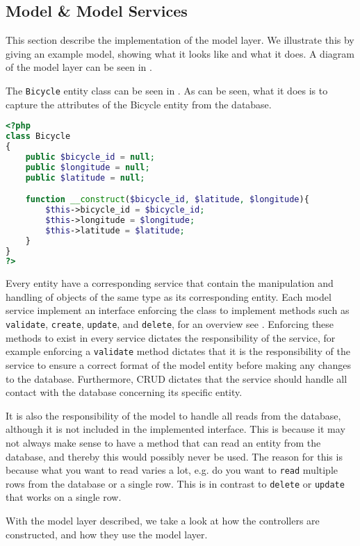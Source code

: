 \subsection{Model \& Model Services}
This section describe the implementation of the model layer. 
We illustrate this by giving an example model, showing what it looks like and what it does.
A diagram of the model layer can be seen in .

The \texttt{Bicycle} entity class can be seen in .
As can be seen, what it does is to capture the attributes of the Bicycle entity from the database.

\begin{minipage}{\textwidth}
\begin{lstlisting}[language=php, label=lst:bicycleModel, caption={Bicycle Class.}]
<?php
class Bicycle
{
    public $bicycle_id = null;
    public $longitude = null;
    public $latitude = null;

    function __construct($bicycle_id, $latitude, $longitude){
        $this->bicycle_id = $bicycle_id;
        $this->longitude = $longitude;
        $this->latitude = $latitude;
    }
}
?>
\end{lstlisting}
\end{minipage}

Every entity have a corresponding service that contain the manipulation and handling of objects of the same type as its corresponding entity. 
Each model service implement an interface enforcing the class to implement methods such as \texttt{validate}, \texttt{create}, \texttt{update}, and \texttt{delete}, for an overview see . 
Enforcing these methods to exist in every service dictates the responsibility of the service, for example enforcing a \texttt{validate} method dictates that it is the responsibility of the service to ensure a correct format of the model entity before making any changes to the database. 
Furthermore, CRUD dictates that the service should handle all contact with the database concerning its specific entity.

It is also the responsibility of the model to handle all reads from the database, although it is not included in the implemented interface.
This is because it may not always make sense to have a method that can read an entity from the database, and thereby this would possibly never be used.
The reason for this is because what you want to read varies a lot, e.g. do you want to \texttt{read} multiple rows from the database or a single row.
This is in contrast to \texttt{delete} or \texttt{update} that works on a single row.

With the model layer described, we take a look at how the controllers are constructed, and how they use the model layer.